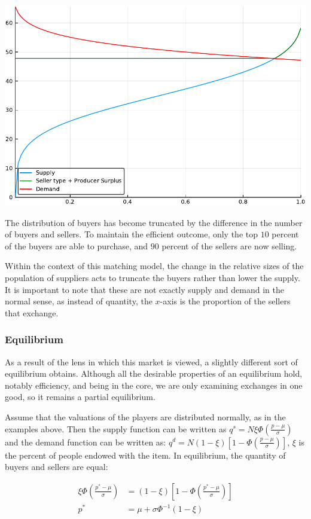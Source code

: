 \documentclass[12pt, letterpaper]{paper}
\begin{document}
\includegraphics[width=.9\linewidth]{../Scripts/oneTenth.pdf}

The distribution of buyers has become truncated by the difference in
the number of buyers and sellers. To maintain the efficient outcome,
only the top $10$ percent of the buyers are able to purchase, and $90$
percent of the sellers are now selling.

Within the context of this matching model, the change in the relative
sizes of the population of suppliers acts to truncate the buyers
rather than lower the supply. It is important to note that these are
not exactly supply and demand in the normal sense, as instead of
quantity, the $x$-axis is the proportion of the sellers that exchange.

\subsubsection{Equilibrium}
\label{sec-2-1-2}
As a result of the lens in which this market is viewed, a slightly
different sort of equilibrium obtains. Although all the desirable
properties of an equilibrium hold, notably efficiency, and being in
the core, we are only examining exchanges in one good, so it remains a
partial equilibrium. \cite{LitReview}

Assume that the valuations of the players are distributed normally, as
in the examples above. Then the supply function can be written as $q^s
= N \xi\Phi \left ( \frac{ p - \mu }{\sigma} \right )$ and the demand function
can be written as: $q^d = N \left ( 1 - \xi\right ) \left [ 1 - \Phi \left
( \frac{ p - \mu }{ \sigma } \right ) \right ]$, $\xi$ is the percent of people
endowed with the item. In equilibrium, the quantity of buyers and
sellers are equal:

\begin{align*}
\xi \Phi \left ( \frac{ p^* - \mu }{\sigma} \right ) &= (1-\xi) \left [ 1 - \Phi \left
( \frac{ p^* - \mu }{\sigma} \right ) \right ]\\
p^* &= \mu + \sigma \Phi^{-1} ( 1- \xi)\\
\end{align*}
\end{document}
